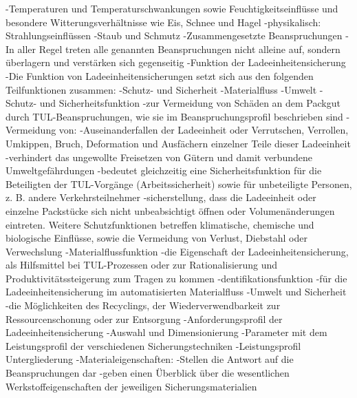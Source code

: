                     -Temperaturen und Temperaturschwankungen sowie Feuchtigkeitseinflüsse und besondere Witterungsverhältnisse wie Eis, Schnee und Hagel
                    -physikalisch: Strahlungseinflüssen
                -Staub und Schmutz
            -Zusammengesetzte Beanspruchungen
                -In aller Regel treten alle genannten Beanspruchungen nicht alleine auf, sondern überlagern und verstärken sich gegenseitig 
        -Funktion der Ladeeinheitensicherung
            -Die Funktion von Ladeeinheitensicherungen setzt sich aus den folgenden Teilfunktionen zusammen:
                -Schutz- und Sicherheit
                -Materialfluss
                -Umwelt
                    -Schutz- und Sicherheitsfunktion
                        -zur Vermeidung von Schäden an dem Packgut durch TUL-Beanspruchungen, wie sie im Beanspruchungsprofil beschrieben sind
                        -Vermeidung von:
                            -Auseinanderfallen der Ladeeinheit oder Verrutschen, Verrollen, Umkippen, Bruch, Deformation und Ausfächern einzelner Teile dieser Ladeeinheit
                            -verhindert das ungewollte Freisetzen von Gütern und damit verbundene Umweltgefährdungen
                            -bedeutet gleichzeitig eine Sicherheitsfunktion für die Beteiligten der TUL-Vorgänge (Arbeitssicherheit) sowie für unbeteiligte Personen, z. B. andere Verkehrsteilnehmer
                            -sicherstellung, dass die Ladeeinheit oder einzelne Packstücke sich nicht unbeabsichtigt öffnen oder Volumenänderungen eintreten. Weitere Schutzfunktionen betreffen klimatische, chemische und biologische Einflüsse, sowie die Vermeidung von Verlust, Diebstahl oder Verwechslung
                    -Materialflussfunktion
                        -die Eigenschaft der Ladeeinheitensicherung, als Hilfsmittel bei TUL-Prozessen oder zur Rationalisierung und Produktivitätssteigerung zum Tragen zu kommen
                        -dentifikationsfunktion
                            -für die Ladeeinheitensicherung im automatisierten Materialfluss
                    -Umwelt und Sicherheit
                        -die Möglichkeiten des Recyclings, der Wiederverwendbarkeit zur Ressourcenschonung oder zur Entsorgung
    -Anforderungsprofil der Ladeeinheitensicherung
        -Auswahl und Dimensionierung
            -Parameter mit dem Leistungsprofil der verschiedenen Sicherungstechniken
                -Leistungsprofil Untergliederung
                    -Materialeigenschaften: 
                        -Stellen die Antwort auf die Beanspruchungen dar   
                        -geben einen Überblick über die wesentlichen Werkstoffeigenschaften der jeweiligen Sicherungsmaterialien
